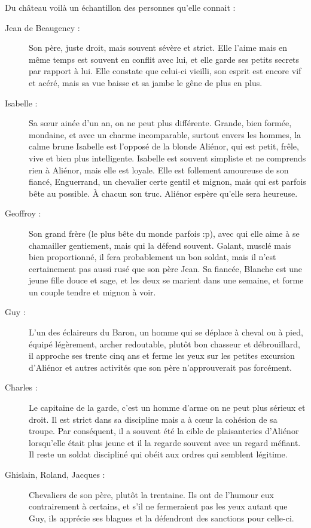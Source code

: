 Du château voilà un échantillon des personnes qu'elle connait :
\begin{description}
\item[Jean de Beaugency :] Son père, juste droit, mais souvent sévère et strict. Elle l'aime mais en même temps est souvent en conflit avec lui, et elle garde ses petits secrets par rapport à lui. Elle constate que celui-ci vieilli, son esprit est encore vif et acéré, mais sa vue baisse et sa jambe le gêne de plus en plus.

\item[Isabelle :] Sa sœur ainée d'un an, on ne peut plus différente. Grande, bien formée, mondaine, et avec un charme incomparable, surtout envers les hommes, la calme brune Isabelle est l'opposé de la blonde Aliénor, qui est petit, frêle, vive et bien plus intelligente. Isabelle est souvent simpliste et ne comprends rien à Aliénor, mais elle est loyale. Elle est follement amoureuse de son fiancé, Enguerrand, un chevalier certe gentil et mignon, mais qui est parfois bête au possible. À chacun son truc. Aliénor espère qu'elle sera heureuse.

\item[Geoffroy :] Son grand frère (le plus bête du monde parfois :p), avec qui elle aime à se chamailler gentiement, mais qui la défend souvent. Galant, musclé mais bien proportionné, il fera probablement un bon soldat, mais il n'est certainement pas aussi rusé que son père Jean.
Sa fiancée, Blanche est une jeune fille douce et sage, et les deux se marient dans une semaine, et forme un couple tendre et mignon à voir.

\item[Guy :] L'un des éclaireurs du Baron, un homme qui se déplace à cheval ou à pied, équipé légèrement, archer redoutable, plutôt bon chasseur et débrouillard, il approche ses trente cinq ans et ferme les yeux sur les petites excursion d'Aliénor et autres activités que son père n'approuverait pas forcément.

\item[Charles :] Le capitaine de la garde, c'est un homme d'arme on ne peut plus sérieux et droit. Il est strict dans sa discipline mais a à cœur la cohésion de sa troupe. Par conséquent, il a souvent été la cible de plaisanteries d'Aliénor lorsqu'elle était plus jeune et il la regarde souvent avec un regard méfiant. Il reste un soldat discipliné qui obéit aux ordres qui semblent légitime.

\item[Ghislain, Roland, Jacques :] Chevaliers de son père, plutôt la trentaine. Ils ont de l'humour eux contrairement à certains, et s'il ne fermeraient pas les yeux autant que Guy, ils apprécie ses blagues et la défendront des sanctions pour celle-ci.


\end{description}
